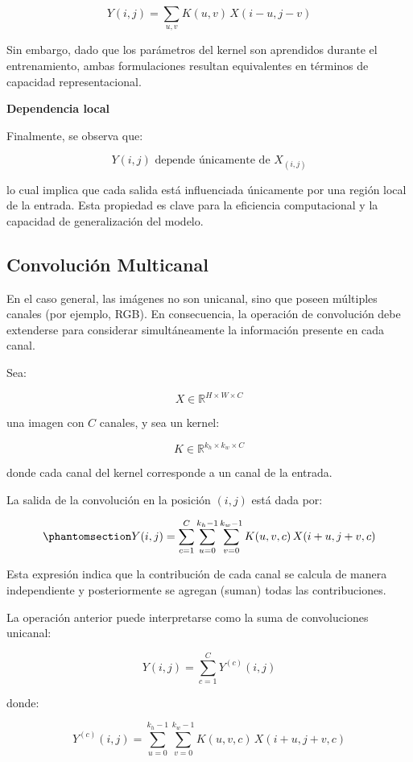 \documentclass[
  spanish,
  us-letterpaper,
]{scrreprt}
\theoremstyle{definition}
\theoremstyle{remark}
\begin{document}
\[
Y(i,j) =
\sum_{u,v} K(u,v)\, X(i-u, j-v)
\]

Sin embargo, dado que los parámetros del kernel son aprendidos durante
el entrenamiento, ambas formulaciones resultan equivalentes en términos
de capacidad representacional.

\textbf{Dependencia local}

Finalmente, se observa que:

\[
Y(i,j) \text{ depende únicamente de } X_{(i,j)}
\]

lo cual implica que cada salida está influenciada únicamente por una
región local de la entrada. Esta propiedad es clave para la eficiencia
computacional y la capacidad de generalización del modelo.

\subsection{Convolución Multicanal}\label{convoluciuxf3n-multicanal}

En el caso general, las imágenes no son unicanal, sino que poseen
múltiples canales (por ejemplo, RGB). En consecuencia, la operación de
convolución debe extenderse para considerar simultáneamente la
información presente en cada canal.

Sea:

\[
X \in \mathbb{R}^{H \times W \times C}
\]

una imagen con \(C\) canales, y sea un kernel:

\[
K \in \mathbb{R}^{k_h \times k_w \times C}
\]

donde cada canal del kernel corresponde a un canal de la entrada.

La salida de la convolución en la posición \((i,j)\) está dada por:

\begin{equation}\phantomsection\label{eq-convolucion-multicanal}{
Y(i,j) =
\sum_{c=1}^{C}
\sum_{u=0}^{k_h-1}
\sum_{v=0}^{k_w-1}
K(u,v,c)\, X(i+u,j+v,c)
}\end{equation}

Esta expresión indica que la contribución de cada canal se calcula de
manera independiente y posteriormente se agregan (suman) todas las
contribuciones.

La operación anterior puede interpretarse como la suma de convoluciones
unicanal:

\[
Y(i,j) = \sum_{c=1}^{C} Y^{(c)}(i,j)
\]

donde:

\[
Y^{(c)}(i,j) =
\sum_{u=0}^{k_h-1}
\sum_{v=0}^{k_w-1}
K(u,v,c)\, X(i+u,j+v,c)
\]
\end{document}
